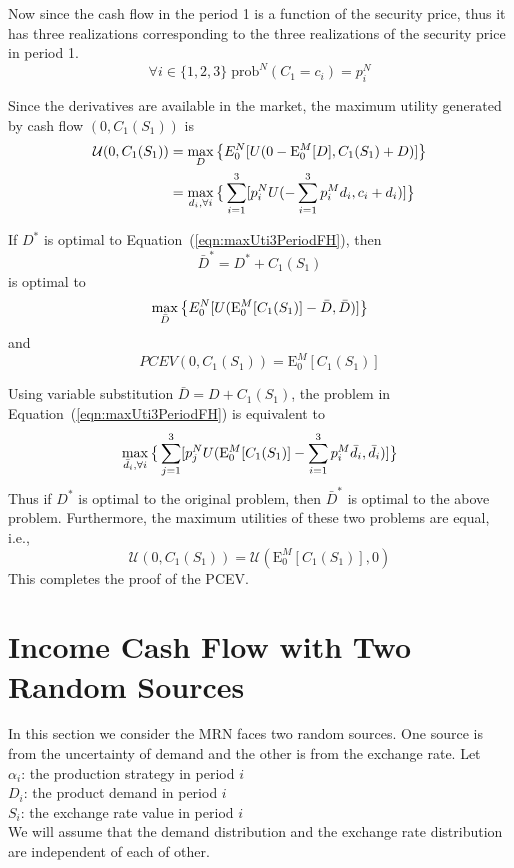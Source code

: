 \documentclass{article}[12pt letter]
\newcommand{\E}{\mathrm{E}}
\begin{document}
 
 Now since the cash flow in the period 1 is a function of the security price, thus it has three realizations corresponding to the three realizations of the security price in period 1. 
 \[ \forall i \in \{1, 2, 3\} \; \text{prob}^N(C_1 = c_i) = p_i^N \]
 
 
Since the derivatives are available in the market, the maximum utility generated by cash flow $(0,C_1(S_1))$ is
\begin{align}
\mathcal{U}(0,C_1(S_1))&= \max_{D}\big{\{} E_0^N [U(0-\E_0^M[D], C_1(S_1) + D)]\big{ \}}\nonumber \\
& = \max_{d_i, \forall i} \big{\{}\sum_{i=1}^3 [p_i^N U(-\sum_{i=1}^3 p_i^M d_i, c_i + d_i)]\big{ \}} \label{eqn:maxUti3PeriodFH}
\end{align}

{\lemma If $D^*$ is optimal to Equation~(\ref{eqn:maxUti3PeriodFH}), then
\[\bar{D}^* = D^* + C_1(S_1) \] 
is optimal to 
\[ \max_{\bar{D}} \big{\{} E_0^N [U(\E_0^M[C_1(S_1)]-\bar{D},  \bar{D} )]\big{ \}} \]
and
\[PCEV(0, C_1(S_1)) = \E_0^M[C_1(S_1)]\]
} 

\proof Using variable substitution $\bar{D} = D + C_1(S_1)$, the problem in Equation~(\ref{eqn:maxUti3PeriodFH}) is equivalent to
\[\max_{\bar{d}_i, \forall i} \big{\{}\sum_{j=1}^3 [p_j^N U(\E_0^M[C_1(S_1)]-\sum_{i=1}^3 p_i^M \bar{d}_i, \bar{d}_i)]\big{ \}} \]
Thus if $D^*$ is optimal to the original problem, then $\bar{D}^*$ is optimal to the above problem. Furthermore, the maximum utilities of these two problems are equal, i.e.,
\[\mathcal{U}(0, C_1(S_1)) = \mathcal{U} (\E_0^M[C_1(S_1)],0) \]
This completes the proof of the PCEV. 
\endproof




\section{Income Cash Flow  with Two Random Sources}
In this section we consider the MRN faces two random sources. One source is from the uncertainty of demand and the other is from the exchange rate.  Let\\
$\alpha_i$: the production strategy in period $i$\\
$D_i$: the product demand in period $i$\\
$S_i$: the exchange rate value in period $i$ \\
We will assume that the demand distribution and the exchange rate distribution are independent of each of other. 
\end{document}
